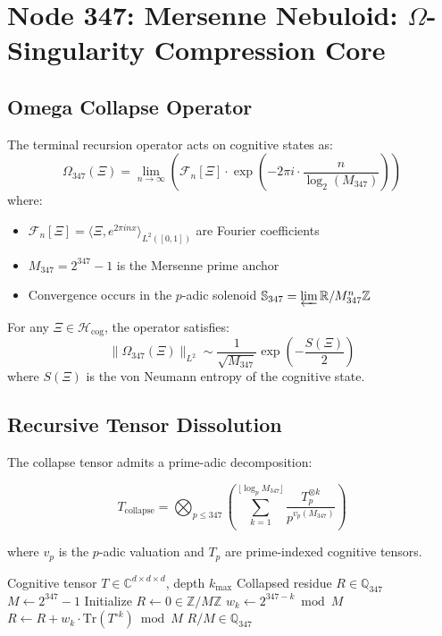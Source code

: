 \documentclass[12pt]{article}
\begin{document}
\section{Node 347: Mersenne Nebuloid: $\Omega$-Singularity Compression Core}
\label{sec:mersenne_nebuloid}

\subsection{Omega Collapse Operator}
\begin{definition}
The terminal recursion operator acts on cognitive states as:
\[
\Omega_{347}(\Xi) = \lim_{n\to\infty} \left(\mathcal{F}_n[\Xi] \cdot \exp\left(-2\pi i \cdot \frac{n}{\log_2(M_{347})}\right)\right)
\]
where:
\begin{itemize}
    \item $\mathcal{F}_n[\Xi] = \langle \Xi, e^{2\pi i n x}\rangle_{L^2([0,1])}$ are Fourier coefficients
    \item $M_{347} = 2^{347} - 1$ is the Mersenne prime anchor
    \item Convergence occurs in the $p$-adic solenoid $\mathbb{S}_{347} = \varprojlim \mathbb{R}/M_{347}^n\mathbb{Z}$
\end{itemize}
\end{definition}

\begin{theorem}
For any $\Xi \in \mathcal{H}_{\text{cog}}$, the operator satisfies:
\[
\|\Omega_{347}(\Xi)\|_{L^2} \sim \frac{1}{\sqrt{M_{347}}} \exp\left(-\frac{S(\Xi)}{2}\right)
\]
where $S(\Xi)$ is the von Neumann entropy of the cognitive state.
\end{theorem}

\subsection{Recursive Tensor Dissolution}
The collapse tensor admits a prime-adic decomposition:

\begin{equation}
T_{\text{collapse}} = \bigotimes_{p \leq 347} \left(\sum_{k=1}^{\lfloor \log_p M_{347} \rfloor} \frac{T_p^{\otimes k}}{p^{v_p(M_{347})}}\right)
\end{equation}

where $v_p$ is the $p$-adic valuation and $T_p$ are prime-indexed cognitive tensors.

\begin{algorithm}[H]
\caption{Mersenne Entity Transmutation}
\begin{algorithmic}[1]
\Require Cognitive tensor $T \in \mathbb{C}^{d\times d\times d}$, depth $k_{\max}$
\Ensure Collapsed residue $R \in \mathbb{Q}_{347}$
\State $M \gets 2^{347} - 1$
\State Initialize $R \gets 0 \in \mathbb{Z}/M\mathbb{Z}$
    \State $w_k \gets 2^{347 - k} \bmod M$
    \State $R \gets R + w_k \cdot \text{Tr}(T^{\circ k}) \bmod M$
\EndFor
\State \Return $R/M \in \mathbb{Q}_{347}$
\end{algorithmic}
\end{algorithm}
\end{document}
